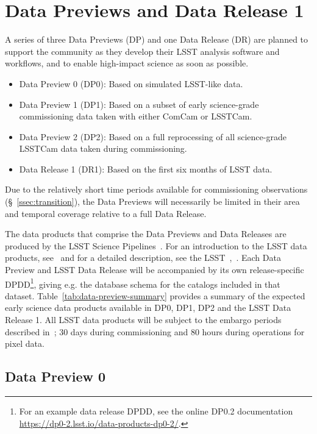 \section{Data Previews and Data Release 1} 
\label{sec:datapreview}

A series of three Data Previews (DP) and one Data Release (DR) are planned to support the community as they develop their LSST analysis software and workflows, and to enable high-impact science as soon as possible.
\begin{itemize}
\item Data Preview 0 (DP0): Based on simulated LSST-like data.
\item Data Preview 1 (DP1): Based on a subset of early science-grade commissioning data taken with either ComCam or LSSTCam.
\item Data Preview 2 (DP2): Based on a full reprocessing of all science-grade LSSTCam data taken during commissioning.
\item Data Release 1 (DR1): Based on the first six months of LSST data. 
\end{itemize}
Due to the relatively short time periods available for commissioning observations (\S~\ref{ssec:transition}), the Data Previews will necessarily be limited in their area and temporal coverage relative to a full Data Release. 

The data products that comprise the Data Previews and Data Releases are produced by the LSST Science Pipelines~\citep{2019ASPC..523..521B,2018PASJ...70S...5B}.
For an introduction to the LSST data products, see~\citet{RubinDataProductsAbridged} and for a detailed description, see the LSST~\dpdd{},~.
Each Data Preview and LSST Data Release will be accompanied by its own release-specific DPDD\footnote{For an example data release DPDD, see the online DP0.2 documentation {\url{https://dp0-2.lsst.io/data-products-dp0-2/}}.}, giving e.g. the  database schema for the catalogs included in that dataset.
Table~\ref{tab:data-preview-summary} provides a summary of the expected early science data products available in DP0, DP1, DP2 and the LSST Data Release 1.
All LSST data products will be subject to the embargo periods described in~; 30 days during commissioning and 80 hours during operations for pixel data.



\subsection{Data Preview 0}
\label{sec:dp0}

